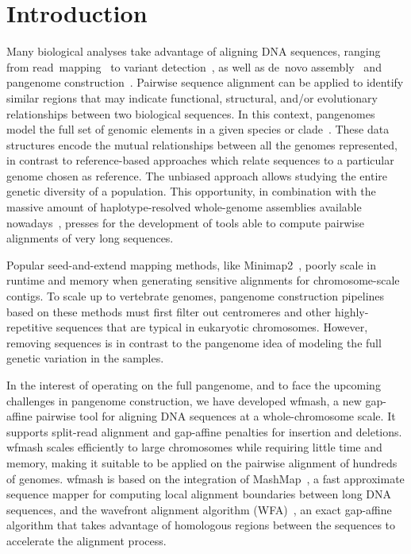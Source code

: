 \documentclass{bioinfo}
\theoremstyle{definition}
\begin{document}
\section{Introduction}
\label{sec:introduction}
Many biological analyses take advantage of aligning DNA sequences, ranging from read~mapping~\citep{Langmead2012, li2013aligning, MarcoSola2012} to variant detection~\citep{DePristo2011}, as well as de~novo assembly~\citep{Simpson2009} and pangenome construction~\citep{Armstrong2020, Li2020, pggb}.
Pairwise sequence alignment can be applied to identify similar regions that may indicate functional, structural, and/or evolutionary relationships between two biological sequences.
In this context, pangenomes model the full set of genomic elements in a given species or clade~\citep{Eizenga_2020}.
These data structures encode the mutual relationships between all the genomes represented, in contrast to reference-based approaches which relate sequences to a particular genome chosen as reference.
The unbiased approach allows studying the entire genetic diversity of a population.
This opportunity, in combination with the massive amount of haplotype-resolved whole-genome assemblies available nowadays~\citep{Garg_2020}, presses for the development of tools able to compute pairwise alignments of very long sequences.

Popular seed-and-extend mapping methods, like Minimap2~\citep{Li_2018}, poorly scale in runtime and memory when generating sensitive alignments for chromosome-scale contigs.
To scale up to vertebrate genomes, pangenome construction pipelines based on these methods must first filter out centromeres and other highly-repetitive sequences that are typical in eukaryotic chromosomes.
However, removing sequences is in contrast to the pangenome idea of modeling the full genetic variation in the samples.

In the interest of operating on the full pangenome, and to face the upcoming challenges in pangenome construction, we have developed wfmash, a new gap-affine pairwise tool for aligning DNA sequences at a whole-chromosome scale.
It supports split-read alignment and gap-affine penalties for insertion and deletions.
wfmash scales efficiently to large chromosomes while requiring little time and memory, making it suitable to be applied on the pairwise alignment of hundreds of genomes.
wfmash is based on the integration of MashMap~\citep{Jain_2018}, a fast approximate sequence mapper for computing local alignment boundaries between long DNA sequences, and the wavefront alignment algorithm (WFA)~\citep{Marco_Sola_2020}, an exact gap-affine algorithm that takes advantage of homologous regions between the sequences to accelerate the alignment process.
\end{document}
